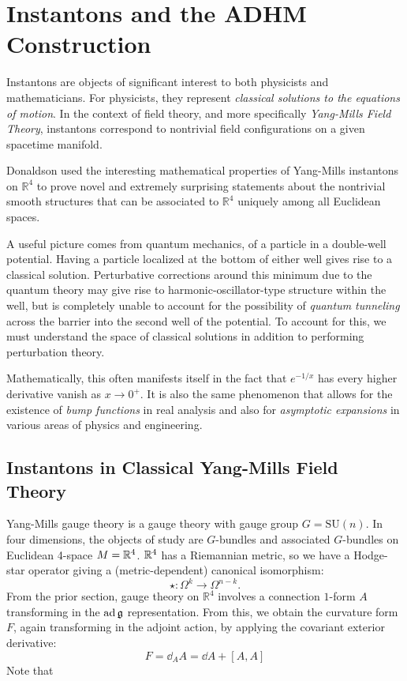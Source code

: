\chapter{Instantons and the ADHM Construction\label{ch:instantons}}

Instantons are objects of significant interest to both physicists and mathematicians. 
For physicists, they represent \emph{classical solutions to the equations of motion}. In the context of field theory, and more specifically \emph{Yang-Mills Field Theory}, instantons correspond to nontrivial field configurations on a given spacetime manifold. 

Donaldson used the interesting mathematical properties of Yang-Mills instantons on $\mathbb R^4$ to prove novel and extremely surprising statements about the nontrivial smooth structures that can be associated to $\mathbb R^4$ uniquely among all Euclidean spaces\cite{donaldson1984}. 

A useful picture comes from quantum mechanics, of a particle in a double-well potential. Having a particle localized at the bottom of either well gives rise to a classical solution. Perturbative corrections around this minimum due to the quantum theory may give rise to harmonic-oscillator-type structure within the well, but is completely unable to account for the possibility of \emph{quantum tunneling} across the barrier into the second well of the potential. To account for this, we must understand the space of classical solutions in addition to performing perturbation theory. 

Mathematically, this often manifests itself in the fact that $e^{-1/x}$ has every higher derivative vanish as $x \to 0^+$. It is also the same phenomenon that allows for the existence of \emph{bump functions} in real analysis and also for \emph{asymptotic expansions} in various areas of physics and engineering.


\section{Instantons in Classical Yang-Mills Field Theory} %
\label{sec:instantons_in_classical_yang_mills_field_theory}

Yang-Mills gauge theory is a gauge theory with gauge group $G = \mathrm{SU}(n)$. In four dimensions, the objects of study are $G$-bundles and associated $G$-bundles on Euclidean 4-space $M = \mathbb{R}^4$. $\mathbb{R}^4$ has a Riemannian metric, so we have a Hodge-star operator giving a (metric-dependent) canonical isomorphism:
\[
	\star: \Omega^k \to \Omega^{n-k}.
\]
From the prior section, gauge theory on $\mathbb R^4$ involves a connection $1$-form $A$ transforming in the $\mathrm{ad}\,\frak{g}$ representation. From this, we obtain the curvature form $F$, again transforming in the adjoint action, by applying the covariant exterior derivative:
\begin{equation}
	F = \dd_A A = \dd A + [A, A]
\end{equation}
Note that 

